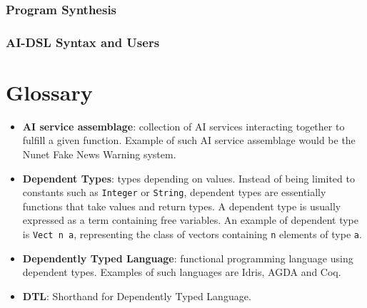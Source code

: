 \documentclass[]{report}
\begin{document}
\subsection{Program Synthesis}

\subsection{AI-DSL Syntax and Users}

\appendix
\chapter{Glossary}
\begin{itemize}
\item \textbf{AI service assemblage}: collection of AI services
  interacting together to fulfill a given function.  Example of such
  AI service assemblage would be the Nunet Fake News Warning system.
\item \textbf{Dependent Types}: types depending on values.  Instead of
  being limited to constants such as \texttt{Integer} or
  \texttt{String}, dependent types are essentially functions that take
  values and return types.  A dependent type is usually expressed as a
  term containing free variables.  An example of dependent type is
  \texttt{Vect n a}, representing the class of vectors containing
  \texttt{n} elements of type \texttt{a}.
\item \textbf{Dependently Typed Language}: functional programming
  language using dependent types.  Examples of such languages are
  Idris, AGDA and Coq.
\item \textbf{DTL}: Shorthand for Dependently Typed Language.
\end{itemize}



\end{document}
